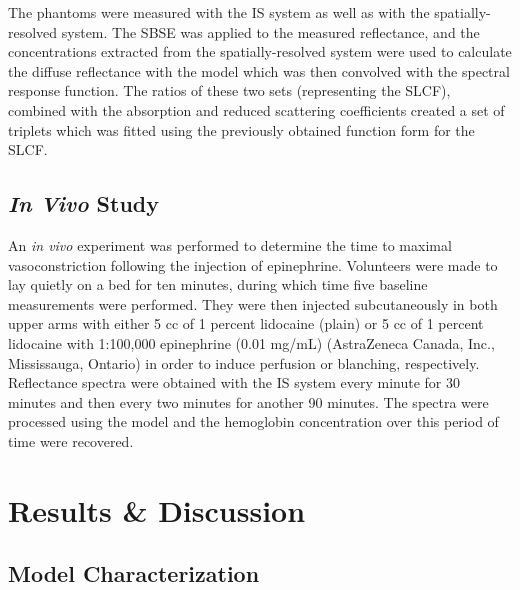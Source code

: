 The phantoms were measured with the IS system as well as with the spatially-resolved system. The SBSE was applied to the measured reflectance, and the concentrations extracted from the spatially-resolved system were used to calculate the diffuse reflectance with the model which was then convolved with the spectral response function. The ratios of these two sets (representing the SLCF), combined with the absorption and reduced scattering coefficients created a set of triplets which was fitted using the previously obtained function form for the SLCF.

\subsection{\emph{In Vivo} Study}
An \emph{in vivo} experiment was performed to determine the time to maximal vasoconstriction following the injection of epinephrine. Volunteers were made to lay quietly on a bed for ten minutes, during which time five baseline measurements were performed. They were then injected subcutaneously in both upper arms with either 5 cc of 1 percent lidocaine (plain) or 5 cc of 1 percent lidocaine with 1:100,000 epinephrine (0.01 mg/mL) (AstraZeneca Canada, Inc., Mississauga, Ontario) in order to induce perfusion or blanching, respectively. Reflectance spectra were obtained with the IS system every minute for 30 minutes and then every two minutes for another 90 minutes. The spectra were processed using the model and the hemoglobin concentration over this period of time were recovered.

\section{Results \& Discussion}

\subsection{Model Characterization}
\label{sec:model_char}


